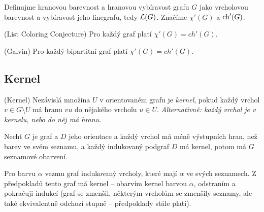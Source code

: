 \df Definujme hranovou barevnost a hranovou vybíravost grafu $G$ jako vrcholovou
barevnost a vybíravost jeho linegrafu, tedy $\mathcal{L}(G)$. Značíme $\chi'(G)$ a
$\operatorname{ch}'(G)$.

\vt (List Coloring Conjecture) Pro každý graf platí $\chi'(G) = ch'(G)$.

\vt (Galvin) Pro každý bipartitní graf platí $\chi'(G) = ch'(G)$.

\subsection{Kernel}

\df (Kernel) Nezávislá množina $U$ v orientovaném grafu je {\it kernel}, pokud 
každý vrchol $v\in G \setminus U$ má hranu $vu$ do nějakého vrcholu $u\in U$.  
{\it Alternativně: každý vrchol je v kernelu, nebo do něj má hranu.}

\lm Nechť $G$ je graf a $D$ jeho orientace a každý vrchol má méně výstupních 
hran, než barev ve svém seznamu, a každý indukovaný podgraf $D$ má kernel, potom
má $G$ seznamové obarvení.

\dk Pro barvu $\alpha$ vezmu graf indukovaný vrcholy, které mají $\alpha$ ve 
svých seznamech. Z předpokladů tento graf má kernel -- obarvím kernel barvou 
$\alpha$, odstraním a pokračuji indukcí (graf se zmenšil, některým vrcholům se 
zmenšily seznamy, ale také ekvivalentně odchozí stupně -- předpoklady stále 
platí).

